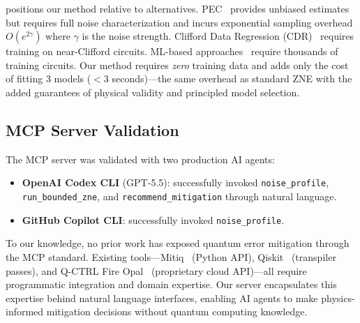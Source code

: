  positions our method relative to alternatives. PEC~\cite{Temme2017, vandenBerg2023} provides unbiased estimates but requires full noise characterization and incurs exponential sampling overhead $O(e^{2\gamma})$ where $\gamma$ is the noise strength. Clifford Data Regression (CDR)~\cite{Czarnik2021} requires training on near-Clifford circuits. ML-based approaches~\cite{Liao2024, Wang2026} require thousands of training circuits. Our method requires \emph{zero} training data and adds only the cost of fitting 3 models ($<$3 seconds)---the same overhead as standard ZNE with the added guarantees of physical validity and principled model selection.

\subsection{MCP Server Validation}

The MCP server was validated with two production AI agents:
\begin{itemize}
    \item \textbf{OpenAI Codex CLI} (GPT-5.5): successfully invoked \texttt{noise\_profile}, \texttt{run\_bounded\_zne}, and \texttt{recommend\_mitigation} through natural language.
    \item \textbf{GitHub Copilot CLI}: successfully invoked \texttt{noise\_profile}.
\end{itemize}

To our knowledge, no prior work has exposed quantum error mitigation through the MCP standard. Existing tools---Mitiq~\cite{LaRose2022} (Python API), Qiskit~\cite{Qiskit2024} (transpiler passes), and Q-CTRL Fire Opal~\cite{Mundada2023} (proprietary cloud API)---all require programmatic integration and domain expertise. Our server encapsulates this expertise behind natural language interfaces, enabling AI agents to make physics-informed mitigation decisions without quantum computing knowledge.
